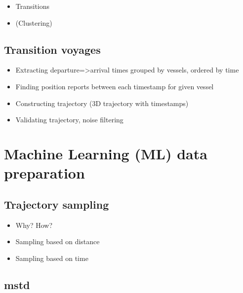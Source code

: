 \begin{itemize}
    \item Transitions
    \item (Clustering)
\end{itemize}


\subsection{Transition voyages}

\begin{itemize}
    \item Extracting departure=>arrival times grouped by vessels, ordered by time
    \item Finding position reports between each timestamp for given vessel
    \item Constructing trajectory (3D trajectory with timestamps)
    \item Validating trajectory, noise filtering
\end{itemize}

\section{Machine Learning (ML) data preparation}

\subsection{Trajectory sampling}

\begin{itemize}
    \item Why? How?
    \item Sampling based on distance
    \item Sampling based on time
\end{itemize}

\subsection{\acrfull{mstd}}

